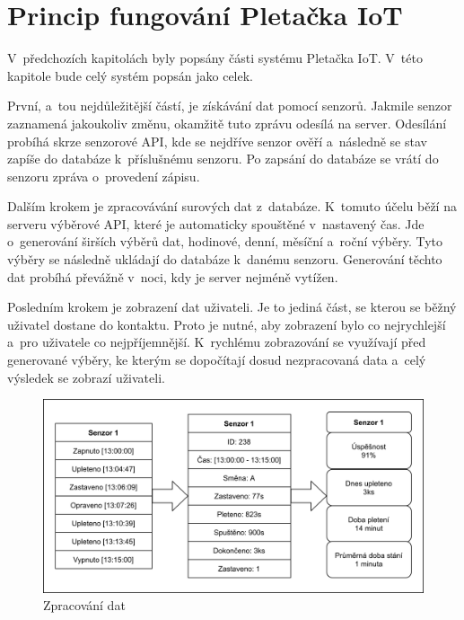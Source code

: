 \documentclass{template/socthesis}
\begin{document}
\section{Princip fungování Pletačka IoT}
V~předchozích kapitolách byly popsány části systému Pletačka IoT.
V~této kapitole bude celý systém popsán jako celek.

První, a~tou nejdůležitější částí, je získávání dat pomocí senzorů.
Jakmile senzor zaznamená jakoukoliv změnu, okamžitě tuto zprávu odesílá na server.
Odesílání probíhá skrze senzorové API, kde se nejdříve senzor ověří a~následně se stav zapíše do databáze k~příslušnému senzoru.
Po zapsání do databáze se vrátí do senzoru zpráva o~provedení zápisu. 

Dalším krokem je zpracovávání surových dat z~databáze.
K~tomuto účelu běží na serveru výběrové API, které je automaticky spouštěné v~nastavený čas.
Jde o~generování širších výběrů dat, hodinové, denní, měsíční a~roční výběry.
Tyto výběry se následně ukládají do databáze k~danému senzoru.
Generování těchto dat probíhá převážně v~noci, kdy je server nejméně vytížen.

Posledním krokem je zobrazení dat uživateli.
Je to jediná část, se kterou se běžný uživatel dostane do kontaktu.
Proto je nutné, aby zobrazení bylo co nejrychlejší a~pro uživatele co nejpříjemnější.
K~rychlému zobrazování se využívají před generované výběry, ke kterým se dopočítají dosud nezpracovaná data a~celý výsledek se zobrazí uživateli.

\begin{figure}[htbp]
    \centering
    \includegraphics[width=\textwidth]{img/Princip.png}
    \caption{Zpracování dat}
    \label{fig:princip}
\end{figure}


\end{document}
